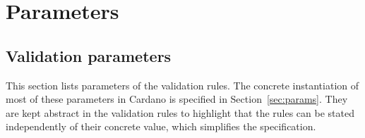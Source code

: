 \documentclass{article}
\begin{document}
\section{Parameters}
\label{sec:parameters}

\subsection{Validation parameters}
\label{sec:validation-parameters}

This section lists parameters of the validation rules. The concrete
instantiation of most of these parameters in Cardano is specified in
Section~\ref{sec:params}. They are kept abstract in the validation
rules to highlight that the rules can be stated independently of their
concrete value, which simplifies the specification.
\end{document}
